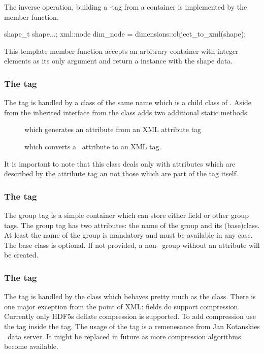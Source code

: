 The inverse operation, building a -tag from a container is 
implemented by the  member function. 
\begin{cppcode}
shape_t shape{...};
xml::node dim_node = dimensions::object_to_xml(shape);
\end{cppcode}
This template member function accepts an arbitrary container with integer 
elements as its only argument and return a  instance 
with the shape data.

\subsubsection{The  tag}
The  tag is handled by a class of the same name which is 
a child class of . Aside from the inherited interface from 
 the  class adds two additional static methods 
\begin{description}
    \item[] which generates an attribute from an 
    XML attribute tag
    \item[] which converts a \nexus\ attribute to 
    an XML tag.
\end{description}
It is important to note that this class deals only with attributes which 
are described by the attribute tag an not those which are part of the 
tag itself. 

\subsubsection{The  tag}
The group tag is a simple container which can store either field or other group
tags. The group tag has two attributes: the name of the group and its
(base)class. At least the name of the group is mandatory and must be available
in any case. The base class is optional. If not provided, a non-\nexus\ group
without an  attribute will be created.

\subsubsection{The  tag}
The  tag is handled by the  class which behaves pretty 
much as the  class. There is one major exception from the 
point of XML: fields do support compression. Currently only HDF5s deflate
compression is supported. To add compression use the  tag 
inside the  tag. The usage of the  tag is a 
remenesance from Jan Kotanskies \nexus\ data server. It might be replaced 
in future as more compression algorithms become available. 

